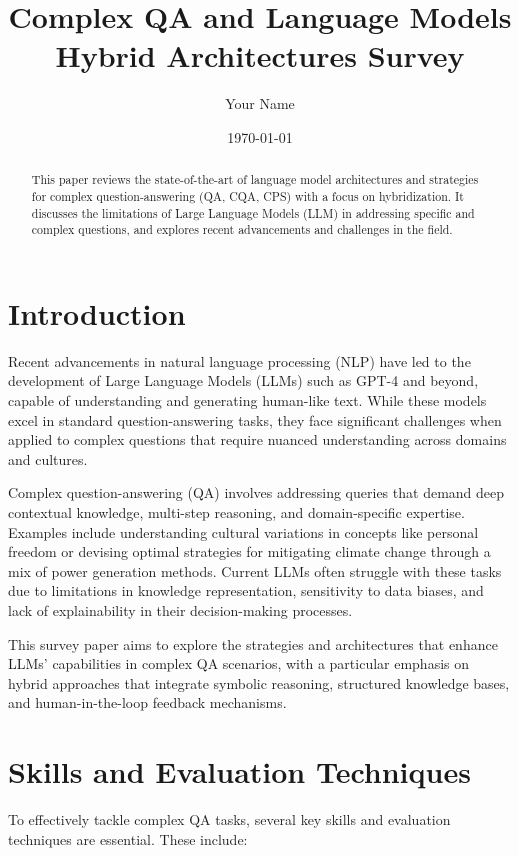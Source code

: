 \documentclass{article}
\title{Complex QA and Language Models Hybrid Architectures Survey}
\author{Your Name}
\date{\today}
\begin{document}
\maketitle

\begin{abstract}
This paper reviews the state-of-the-art of language model architectures and strategies for complex question-answering (QA, CQA, CPS) with a focus on hybridization. It discusses the limitations of Large Language Models (LLM) in addressing specific and complex questions, and explores recent advancements and challenges in the field.
\end{abstract}

\tableofcontents

\section{Introduction}
Recent advancements in natural language processing (NLP) have led to the development of Large Language Models (LLMs) such as GPT-4 and beyond, capable of understanding and generating human-like text. While these models excel in standard question-answering tasks, they face significant challenges when applied to complex questions that require nuanced understanding across domains and cultures.

Complex question-answering (QA) involves addressing queries that demand deep contextual knowledge, multi-step reasoning, and domain-specific expertise. Examples include understanding cultural variations in concepts like personal freedom or devising optimal strategies for mitigating climate change through a mix of power generation methods. Current LLMs often struggle with these tasks due to limitations in knowledge representation, sensitivity to data biases, and lack of explainability in their decision-making processes.

This survey paper aims to explore the strategies and architectures that enhance LLMs' capabilities in complex QA scenarios, with a particular emphasis on hybrid approaches that integrate symbolic reasoning, structured knowledge bases, and human-in-the-loop feedback mechanisms.

\section{Skills and Evaluation Techniques}
To effectively tackle complex QA tasks, several key skills and evaluation techniques are essential. These include:
\end{document}
